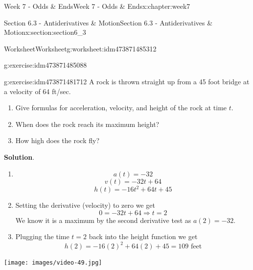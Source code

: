 \documentclass[oneside,10pt,]{book}
\newcommand{\blocktitlefont}{\relax}
\numberwithin{equation}{section}
\newlength{\qrsize}
\newlength{\previewwidth}
\begin{document}
\begin{chapterptx}{Week 7 - Odds \& Ends}{}{Week 7 - Odds \& Ends}{}{}{x:chapter:week7}
\begin{sectionptx}{Section 6.3 - Antiderivatives \& Motion}{}{Section 6.3 - Antiderivatives \& Motion}{}{}{x:section:section6_3}
\begin{worksheet-subsection}{Worksheet}{}{Worksheet}{}{}{g:worksheet:idm473871485312}
\begin{divisionexercise}{1}{}{}{g:exercise:idm473871485088}
\end{divisionexercise}%
\begin{divisionexercise}{2}{}{}{g:exercise:idm473871481712}%
A rock is thrown straight up from a 45 foot bridge at a velocity of 64 ft\slash{}sec.%
%
\begin{enumerate}[label=(\alph*)]
\item{}Give formulas for acceleration, velocity, and height of the rock at time \(t\).%
\item{}When does the rock reach its maximum height?%
\item{}How high does the rock fly?%
\end{enumerate}
\textbf{\blocktitlefont Solution}.\hypertarget{g:solution:idm473871479616}{}\quad{}%
\begin{enumerate}[label=(\alph*)]
\item{}%
\begin{equation*}
a(t) = -32
\end{equation*}
%
\begin{equation*}
v(t) = -32t+64
\end{equation*}
%
\begin{equation*}
h(t) = -16t^2+64t+45
\end{equation*}
%
\item{}Setting the derivative (velocity) to zero we get%
%
\begin{equation*}
0 = -32t+64 \Rightarrow t=2 
\end{equation*}
We know it is a maximum by the second derivative test as \(a(2)=-32\).%
\item{}Plugging the time \(t=2\) back into the height function we get%
\begin{equation*}
h(2) = -16(2)^2+64(2)+45 = 109\text{ feet}
\end{equation*}
%
\end{enumerate}
\end{divisionexercise}%
\end{worksheet-subsection}
\restoregeometry
\setlength{\qrsize}{9em}
\setlength{\previewwidth}{\linewidth}
\addtolength{\previewwidth}{-\qrsize}
\begin{tcbraster}[raster columns=2, raster column skip=1pt, raster halign=center, raster force size=false, raster left skip=0pt, raster right skip=0pt]%
\begin{tcolorbox}[previewstyle, width=\previewwidth]%
\texttt{[image: images/video-49.jpg]}%
\end{tcolorbox}%
\begin{tcolorbox}[qrstyle]%

\end{tcolorbox}
\end{tcbraster}
\end{sectionptx}
\end{chapterptx}
\end{document}
